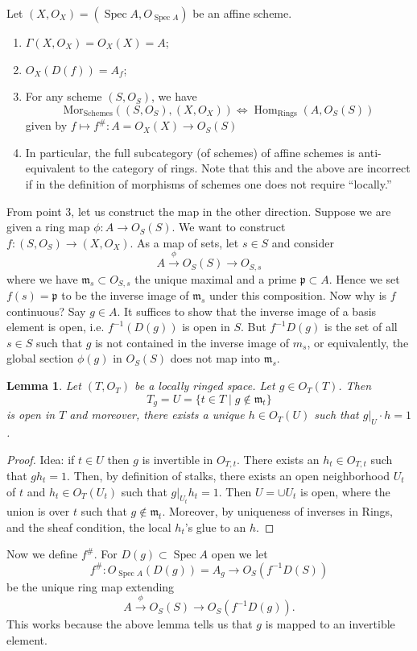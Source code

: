 \documentclass{article}
\newcommand{\fr}{\mathfrak}
\DeclareMathOperator{\Hom}{Hom}
\DeclareMathOperator{\Spec}{Spec}
\theoremstyle{plain}
\newtheorem*{lem*}{Lemma}
\theoremstyle{definition}
\theoremstyle{remark}
\begin{document}
Let $(X,O_X)=(\Spec A,O_{\Spec A})$ be an affine scheme.

\begin{enumerate}
\item $\Gamma(X,O_X)=O_X(X)=A$;
\item $O_X(D(f))=A_f$;
\item For any scheme $(S,O_S)$, we have
\[\text{Mor}_{\text{Schemes}}((S,O_S),(X,O_X))\Leftrightarrow \Hom_{\text{Rings}}(A,O_S(S))\]
given by
$f\mapsto f^\#:A=O_X(X)\to O_S(S)$
\item In particular, the full subcategory (of schemes) of affine schemes is anti-equivalent to the category of rings. Note that this and the above are incorrect if in the definition of morphisms of schemes one does not require ``locally.''
\end{enumerate}

From point 3, let us construct the map in the other direction. Suppose we are given a ring map $\phi: A\to O_S(S)$. We want to construct $f:(S,O_S)\to(X,O_X)$. As a map of sets, let $s\in S$ and consider
\[A\overset{\phi}{\to}O_S(S)\to O_{S,s}\]
where we have $\fr m_s\subset O_{S,s}$ the unique maximal and a prime $\fr p\subset A$. Hence we set $f(s)=\fr p$ to be the inverse image of $\fr m_s$ under this composition. Now why is $f$ continuous? Say $g\in A$. It suffices to show that the inverse image of a basis element is open, i.e. $f^{-1}(D(g))$ is open in $S$. But $f^{-1}D(g)$ is the set of all $s\in S$ such that $g$ is not contained in the inverse image of $m_s$, or equivalently, the global section $\phi(g)$ in $O_S(S)$ does not map into $\fr m_s$.

\begin{lem*}
Let $(T,O_T)$ be a locally ringed space. Let $g\in O_T(T)$. Then
\[T_g=U=\{t\in T\mid g\notin \fr m_t\}\]
is open in $T$ and moreover, there exists a unique $h\in O_T(U)$ such that $g|_U\cdot h=1$.
\end{lem*}
\begin{proof}
Idea: if $t\in U$ then $g$ is invertible in $O_{T,t}$. There exists an $h_t\in O_{T,t}$ such that $gh_t=1$. Then, by definition of stalks, there exists an open neighborhood $U_t$ of $t$ and $h_t\in O_T(U_t)$ such that $g|_{U_t}h_t=1$. Then $U=\cup U_t$ is open, where the union is over $t$ such that $g\notin\fr m_t$. Moreover, by uniqueness of inverses in Rings, and the sheaf condition, the local $h_t$'s glue to an $h$.
\end{proof}

Now we define $f^\#$. For $D(g)\subset \Spec A$ open we let \[f^\#:O_{\Spec A}(D(g))=A_g\to O_S(f^{-1}D(S))\] be the unique ring map extending \[A\overset{\phi}{\to} O_S(S)\to O_S(f^{-1}D(g)).\]
This works because the above lemma tells us that $g$ is mapped to an invertible element.
\end{document}
